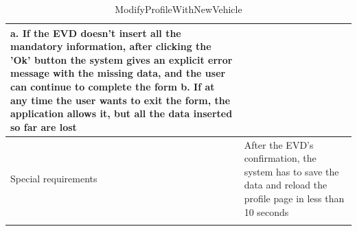 \begin{center}
\begin{longtable}{p{4cm} p{11cm}}
        a. If the EVD doesn't insert all the mandatory information, after clicking the 'Ok' button the system gives an explicit error message with the missing data, and the user can continue to complete the form \newline
        b. If at any time the user wants to exit the form, the application allows it, but all the data inserted so far are lost \\
     \hline
     Special requirements & After the EVD's confirmation, the system has to save the data and reload the profile page in less than 10 seconds \\
     \hline
    \caption{ModifyProfileWithNewVehicle}
    \label{tab:ModifyProfileWithNewVehicle}
    \end{longtable}
\end{center}

\clearpage
